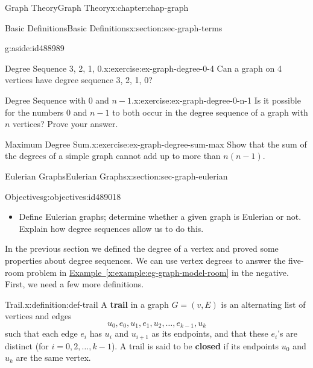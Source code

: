 \documentclass[oneside,10pt,]{book}
\newcommand{\xreffont}{\relax}
\newcommand{\terminology}[1]{\textbf{#1}}
\numberwithin{equation}{section}
\begin{document}
\begin{chapterptx}{Graph Theory}{}{Graph Theory}{}{}{x:chapter:chap-graph}
\begin{sectionptx}{Basic Definitions}{}{Basic Definitions}{}{}{x:section:sec-graph-terms}
\begin{aside}{}{g:aside:id488989}
\end{aside}
\begin{inlineexercise}{Degree Sequence 3, 2, 1, 0.}{x:exercise:ex-graph-degree-0-4}%
Can a graph on 4 vertices have degree sequence 3, 2, 1, 0?%
\end{inlineexercise}
\begin{inlineexercise}{Degree Sequence with 0 and \(n-1\).}{x:exercise:ex-graph-degree-0-n-1}%
Is it possible for the numbers \(0\) and \(n-1\) to both occur in the degree sequence of a graph with \(n\) vertices? Prove your answer.%
\end{inlineexercise}
\begin{inlineexercise}{Maximum Degree Sum.}{x:exercise:ex-graph-degree-sum-max}%
Show that the sum of the degrees of a simple graph cannot add up to more than \(n(n-1)\).%
\end{inlineexercise}
\end{sectionptx}
%
%
\typeout{************************************************}
\typeout{************************************************}
%
\begin{sectionptx}{Eulerian Graphs}{}{Eulerian Graphs}{}{}{x:section:sec-graph-eulerian}
\begin{objectives}{Objectives}{g:objectives:id489018}
%
\begin{itemize}[label=\textbullet]
\item{}Define Eulerian graphs; determine whether a given graph is Eulerian or not. Explain how degree sequences allow us to do this.%
\end{itemize}
\end{objectives}
In the previous section we defined the degree of a vertex and proved some properties about degree sequences. We can use vertex degrees to answer the five-room problem in \hyperref[x:example:eg-graph-model-room]{Example~{\xreffont\ref{x:example:eg-graph-model-room}}} in the negative. First, we need a few more definitions.%
\begin{definition}{Trail.}{x:definition:def-trail}%
A \terminology{trail} in a graph \(G = (v,E)\) is an alternating list of vertices and edges%
\begin{equation*}
u_0,e_0,u_1,e_1,u_2,\ldots,e_{k-1},u_k
\end{equation*}
such that each edge \(e_i\) has \(u_i\) and \(u_{i+1}\) as its endpoints, and that these \(e_i\)'s are distinct (for \(i = 0,2,\ldots,k-1\)). A trail is said to be \terminology{closed} if its endpoints \(u_0\) and \(u_k\) are the same vertex.%

\end{definition}
\end{sectionptx}
\end{chapterptx}
\end{document}
